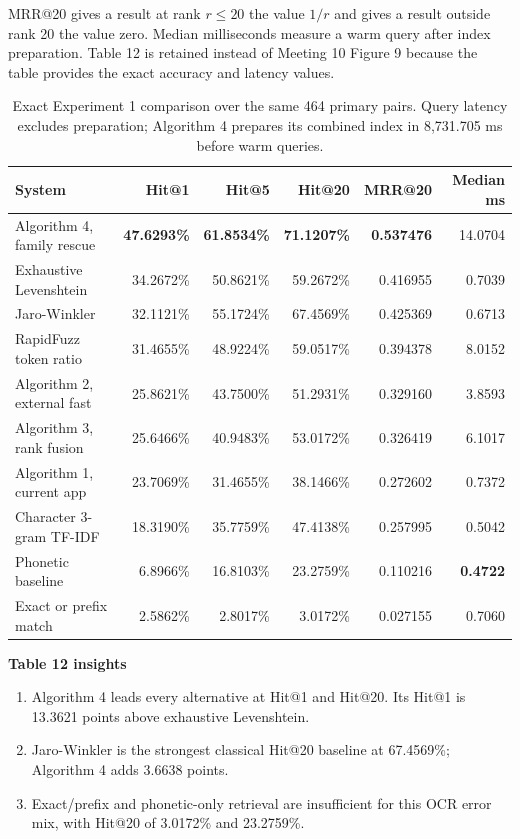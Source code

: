 \documentclass[11pt,a4paper]{article}
\renewcommand{\arraystretch}{1.10}
\begin{document}
\clearpage
{\small
\setlength{\intextsep}{4pt}
\setlength{\abovecaptionskip}{3pt}
\setlength{\belowcaptionskip}{0pt}
\renewcommand{\arraystretch}{1.0}
MRR@20 gives a result at rank $r\leq20$ the value $1/r$ and gives a result
outside rank 20 the value zero. Median milliseconds measure a warm query after
index preparation. Table 12 is retained instead of Meeting 10 Figure 9 because
the table provides the exact accuracy and latency values.

\begin{table}[H]
\centering
\footnotesize
\begin{tabular}{@{}lrrrrr@{}}
\toprule
\textbf{System} & \textbf{Hit@1} & \textbf{Hit@5} & \textbf{Hit@20} &
\textbf{MRR@20} & \textbf{Median ms} \\
\midrule
Algorithm 4, family rescue & \textbf{47.6293\%} & \textbf{61.8534\%} & \textbf{71.1207\%} & \textbf{0.537476} & 14.0704 \\
Exhaustive Levenshtein & 34.2672\% & 50.8621\% & 59.2672\% & 0.416955 & 0.7039 \\
Jaro-Winkler & 32.1121\% & 55.1724\% & 67.4569\% & 0.425369 & 0.6713 \\
RapidFuzz token ratio & 31.4655\% & 48.9224\% & 59.0517\% & 0.394378 & 8.0152 \\
Algorithm 2, external fast & 25.8621\% & 43.7500\% & 51.2931\% & 0.329160 & 3.8593 \\
Algorithm 3, rank fusion & 25.6466\% & 40.9483\% & 53.0172\% & 0.326419 & 6.1017 \\
Algorithm 1, current app & 23.7069\% & 31.4655\% & 38.1466\% & 0.272602 & 0.7372 \\
Character 3-gram TF-IDF & 18.3190\% & 35.7759\% & 47.4138\% & 0.257995 & 0.5042 \\
Phonetic baseline & 6.8966\% & 16.8103\% & 23.2759\% & 0.110216 & \textbf{0.4722} \\
Exact or prefix match & 2.5862\% & 2.8017\% & 3.0172\% & 0.027155 & 0.7060 \\
\bottomrule
\end{tabular}
\caption{Exact Experiment 1 comparison over the same 464 primary pairs. Query
latency excludes preparation; Algorithm 4 prepares its combined index in
8,731.705 ms before warm queries.}
\end{table}

\textbf{Table 12 insights}
\begin{enumerate}
  \item Algorithm 4 leads every alternative at Hit@1 and Hit@20. Its Hit@1 is
        13.3621 points above exhaustive Levenshtein.
  \item Jaro-Winkler is the strongest classical Hit@20 baseline at 67.4569\%;
        Algorithm 4 adds 3.6638 points.
  \item Exact/prefix and phonetic-only retrieval are insufficient for this OCR
        error mix, with Hit@20 of 3.0172\% and 23.2759\%.
\end{enumerate}

}
\end{document}
